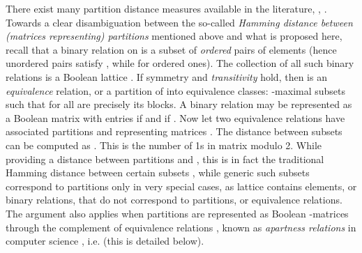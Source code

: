 \documentclass[a4paper,10pt]{article}
\begin{document}
There exist many partition distance measures available in the literature, \cite[Sections 10.2, 10.3, pp. 191-193]{DezaDeza2013}, \cite[Chapter 5]{Mirkin1996}
\cite{Day1981,HubertArabie1985,Warrens2008}. Towards a clear disambiguation between the so-called \textit{Hamming distance between (matrices representing) partitions}
\cite{Meila2007,Mirkin+1970,Mirkin+2008} mentioned above and what is proposed here, recall that a binary relation  on  is a subset  of
\textit{ordered} pairs  of elements  (hence unordered pairs  satisfy , while  for ordered ones). The collection of all
such binary relations is a Boolean lattice . If symmetry  and  \textit{transitivity}
 hold, then  is an \textit{equivalence} relation, or a partition of  into equivalence classes: -maximal
subsets  such that  for all  are precisely its blocks. A binary relation  may be represented as a Boolean matrix
 with entries  if  and  if . Now let two equivalence
relations  have associated partitions  and representing matrices . The distance  between
subsets  can be computed as
. This is the number of 1s in matrix
 modulo 2. While providing a distance between partitions  and , this is in fact the traditional Hamming
distance between certain subsets , while generic such subsets  correspond to partitions only in very special cases, as
lattice  contains  elements, or binary relations, that do not correspond to partitions, or equivalence relations. The argument
also applies when partitions are represented as Boolean -matrices through the complement  of equivalence relations , known as
\textit{apartness relations} in computer science \cite{EllermanLogicalEntropy,EllermanLogic}, i.e.  (this is detailed below).
\end{document}
